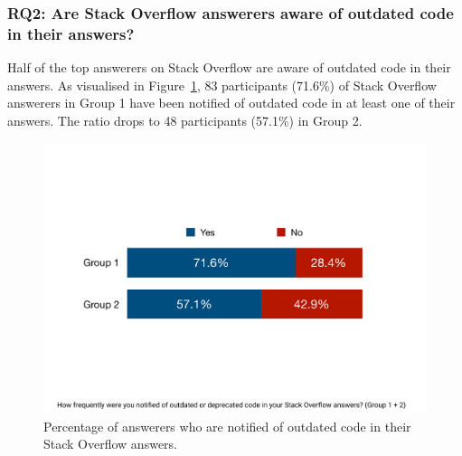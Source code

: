\documentclass{svjour3}                     %
\begin{document}
\subsubsection*{RQ2: Are Stack Overflow answerers aware of outdated code in their answers?}

Half of the top answerers on Stack Overflow are aware of outdated code in their
answers. As visualised in Figure~\ref{fig:survey_outdated}, 83 participants (71.6\%)
of Stack Overflow answerers in Group 1 have been notified of outdated code in at
least one of their answers. The ratio drops to 48 participants (57.1\%) in Group 2.

\begin{figure}
	\centering
	\includegraphics[width=.5\linewidth]{survey_outdated}
	\caption{Percentage of answerers who are notified of outdated code in their Stack Overflow answers.}
	\label{fig:survey_outdated}
\end{figure}
\end{document}
